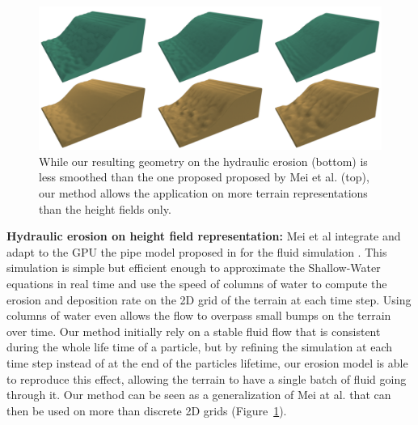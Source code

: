 \begin{figure}[b]
\centering
\includegraphics[width= 1\linewidth]{otherPapersRepro/hydro.pdf}
\caption{While our resulting geometry on the hydraulic erosion (bottom) is less smoothed than the one proposed proposed by Mei et al. \cite{Mei2007} (top), our method allows the application on more terrain representations than the height fields only.}
\label{Erosion-fig:screen-mei2007-1}

\end{figure}

\textbf{Hydraulic erosion on height field representation: }
Mei et al integrate and adapt to the GPU the pipe model proposed in \cite{OBrien1995} for the fluid simulation \cite{Mei2007}. This simulation is simple but efficient enough to approximate the Shallow-Water equations in real time and use the speed of columns of water to compute the erosion and deposition rate on the 2D grid of the terrain at each time step. Using columns of water even allows the flow to overpass small bumps on the terrain over time. Our method initially rely on a stable fluid flow that is consistent during the whole life time of a particle, but by refining the simulation at each time step instead of at the end of the particles lifetime, our erosion model is able to reproduce this effect, allowing the terrain to have a single batch of fluid going through it. Our method can be seen as a generalization of Mei at al. that can then be used on more than discrete 2D grids (Figure~\ref{Erosion-fig:screen-mei2007-1}). 

